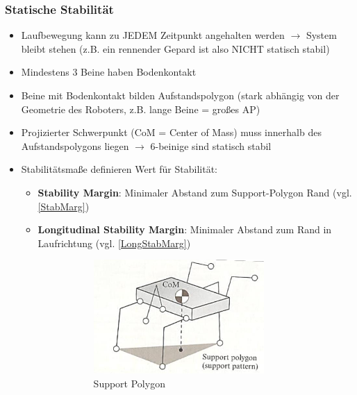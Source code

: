 \subsubsection{Statische Stabilität}
\begin{itemize}
\item Laufbewegung kann zu JEDEM Zeitpunkt angehalten werden $\rightarrow$ System bleibt stehen
(z.B. ein rennender Gepard ist also NICHT statisch stabil)
\item Mindestens 3 Beine haben Bodenkontakt
\item Beine mit Bodenkontakt bilden Aufstandspolygon (stark abhängig von der Geometrie des Roboters, z.B. lange Beine = großes AP)
\item Projizierter Schwerpunkt (CoM = Center of Mass) muss innerhalb des Aufstandspolygons liegen $\rightarrow$ 6-beinige sind statisch stabil
\item Stabilitätsmaße definieren Wert für Stabilität:
\begin{itemize}
\item \textbf{Stability Margin}: Minimaler Abstand zum Support-Polygon Rand (vgl. \autoref{StabMarg})
\item \textbf{Longitudinal Stability Margin}: Minimaler Abstand zum Rand in Laufrichtung (vgl. \autoref{LongStabMarg})
\begin{figure}[h!]
	\centering
	\begin{subfigure}{.3\textwidth}
		\includegraphics[width=\textwidth]{figures/ch06_supppoly.png}
		\caption{Support Polygon}
		\label{SP}
	\end{subfigure}
	\begin{subfigure}{.3\textwidth}

\end{subfigure}
\end{figure}
\end{itemize}
\end{itemize}
